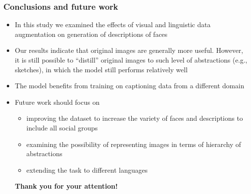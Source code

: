 \documentclass[aspectratio=1610]{beamer} %
\begin{document}
\begin{frame}
\frametitle{Conclusions and future work}
\begin{itemize}

\item In this study we examined the effects of visual and linguistic data augmentation on generation of descriptions of faces
\item Our results indicate that original images are generally more useful. However, it is still possible to ``distill'' original images to such level of abstractions (e.g., sketches), in which the model still performs relatively well
\item The model benefits from training on captioning data from a different domain
\pause
\item Future work should focus on
\begin{itemize}
	\item improving the dataset to increase the variety of faces and descriptions to include all social groups %
	\item examining the possibility of representing images in terms of hierarchy of abstractions
	\item extending the task %
              to different languages
\end{itemize}

\pause
\textbf{Thank you for your attention!}

\end{itemize}
\end{frame}
\end{document}
